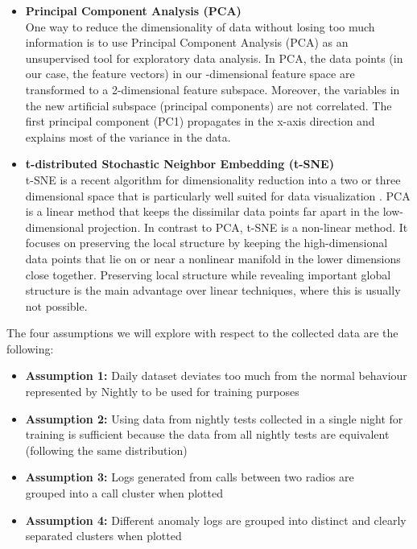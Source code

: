 \begin{itemize} 

\item \textbf{Principal Component Analysis (PCA)} \\ One way to reduce the dimensionality of data without losing too much information is to use Principal Component Analysis (PCA) as an unsupervised tool for exploratory data analysis. In PCA, the data points (in our case, the feature vectors) in our \featureVectorLength-dimensional feature space are transformed to a 2-dimensional feature subspace. Moreover, the variables in the new artificial subspace (principal components) are not correlated. The first principal component (PC1) propagates in the x-axis direction and explains most of the variance in the data.
    
   \item \textbf{t-distributed Stochastic Neighbor Embedding (t-SNE)}\\ t-SNE is a recent algorithm for dimensionality reduction into a two or three dimensional space that is particularly well suited for data visualization \cite{tsne}. PCA is a linear method that keeps the dissimilar data points far apart in the low-dimensional projection. In contrast to PCA, t-SNE is a non-linear method. It focuses on preserving the local structure by keeping the high-dimensional data points that lie on or near a nonlinear manifold in the lower dimensions close together. Preserving local structure while revealing important global structure is the main advantage over linear techniques, where this is usually not possible.
    
\end{itemize}

The four assumptions we will explore with respect to the collected data are the following: 

\begin{itemize} 
    \item \textbf{Assumption 1:} Daily dataset deviates too much from the normal behaviour represented by Nightly to be used for training purposes 
    \item \textbf{Assumption 2:} Using data from nightly tests collected in a single night for training is sufficient because the data from all nightly tests are equivalent (following the same distribution)
    \item \textbf{Assumption 3:} Logs generated from calls between two radios are\\
    grouped into a call cluster when plotted 
    \item \textbf{Assumption 4:} Different anomaly logs are grouped into distinct and clearly separated clusters when plotted
\end{itemize}

